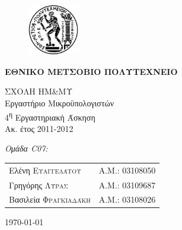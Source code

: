 \begin{titlepage}
\begin{center}
\begin{figure}[h] 
     \includegraphics[width=0.2\textwidth]{title/ntua_logo}
\end{figure}
\vspace{1cm}
\begin{LARGE}\textbf{ΕΘΝΙΚΟ ΜΕΤΣΟΒΙΟ ΠΟΛΥΤΕΧΝΕΙΟ\\[1.5cm]}\end{LARGE}
\begin{Large}
ΣΧΟΛΗ ΗΜ\&ΜΥ\\
Εργαστήριο Μικροϋπολογιστών\\[2cm]
4\textsuperscript{η} Εργαστηριακή Άσκηση\\
Ακ. έτος 2011-2012\\
\end{Large}
\vfill
\begin{flushright}
\Large \textit{Ομάδα C07:}\\[1cm]
\begin{tabular}{l r}
{Ελένη \textsc{Ευαγγελάτου}}&
{Α.Μ.: 03108050}\\
{Γρηγόρης \textsc{Λύρας}}&
{Α.Μ.: 03109687}\\
{Βασιλεία \textsc{Φραγκιαδάκη}}&
{Α.Μ.: 03108026}\\
\end{tabular}
\end{flushright}

\large\today\\
\end{center}
\end{titlepage}


